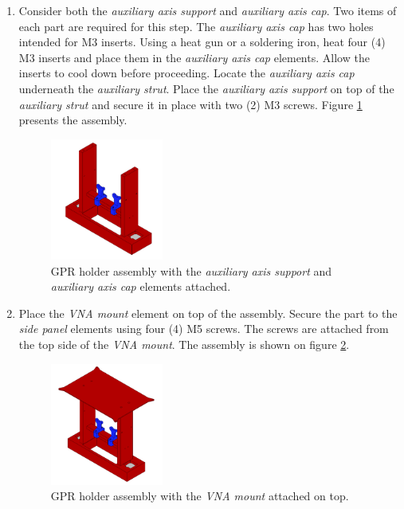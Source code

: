 \documentclass{article}
\begin{document}
\begin{enumerate}
    \item Consider both the \textit{auxiliary axis support} and \textit{auxiliary axis cap}. Two items of each part are required for this step. The \textit{auxiliary axis cap} has two holes intended for M3 inserts. Using a heat gun or a soldering iron, heat four (4) M3 inserts and place them in the \textit{auxiliary axis cap} elements. Allow the inserts to cool down before proceeding. Locate the \textit{auxiliary axis cap} underneath the \textit{auxiliary strut}. Place the \textit{auxiliary axis support} on top of the \textit{auxiliary strut} and secure it in place with two (2) M3 screws. Figure \ref{fig:vna_holder_5} presents the assembly.
 
     \begin{figure}[H]
        \centering
        \includegraphics[width=0.35\textwidth]{images/vna_holder/step_E.png}
        \caption{GPR holder assembly with the \textit{auxiliary axis support} and \textit{auxiliary axis cap} elements attached.}
        \label{fig:vna_holder_5}
    \end{figure}
    
    \item Place the \textit{VNA mount} element on top of the assembly. Secure the part to the \textit{side panel} elements using four (4) M5 screws. The screws are attached from the top side of the \textit{VNA mount}. The assembly is shown on figure \ref{fig:vna_holder_6}.
    
    \begin{figure}[H]
        \centering
        \includegraphics[width=0.35\textwidth]{images/vna_holder/step_F.png}
        \caption{GPR holder assembly with the \textit{VNA mount} attached on top.}
        \label{fig:vna_holder_6}
    \end{figure}
 

\end{enumerate}
\end{document}
